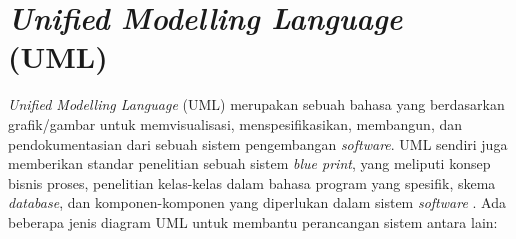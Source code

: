 \section{\textit{Unified Modelling Language} (UML)}

\textit{Unified Modelling Language} (UML) merupakan sebuah bahasa yang berdasarkan grafik/gambar untuk memvisualisasi, menspesifikasikan, membangun, dan pendokumentasian dari sebuah sistem pengembangan \textit{software}. UML sendiri juga memberikan standar penelitian sebuah sistem \textit{blue print}, yang meliputi konsep bisnis proses, penelitian kelas-kelas dalam bahasa program yang spesifik, skema \textit{database}, dan komponen-komponen yang diperlukan dalam sistem \textit{software} \cite{Mubarak2019}. Ada beberapa jenis diagram UML untuk membantu perancangan sistem antara lain:

